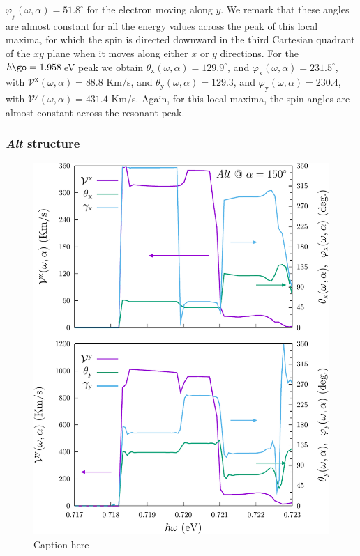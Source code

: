 \documentclass[prb,11pt,tightenlines,twocolumn,aps]{revtex4-1}
\begin{document}
$\varphi_{\mathrm{y}} (\omega,\alpha) = 51.8^{\circ}$
% 
for the electron moving along $y$. We remark that these angles are almost
constant for all the energy values across the peak of this local maxima, for
which the spin is directed downward in the third Cartesian quadrant of the $xy$
plane when it moves along either $x$ or $y$ directions. 
% 
For the $\hbar\go=1.958$\,eV peak we obtain 
$\theta_{\mathrm{x}} (\omega,\alpha) = 129.9^{\circ}$, and 
$\varphi_{\mathrm{x}} (\omega,\alpha) = 231.5^{\circ}$, with 
$\mathcal{V}^{\mathrm{x}} (\omega,\alpha) = 88.8$ Km/s, and
% 
$\theta_{\mathrm{y}}(\omega,\alpha) =129.3$, and
$\varphi_{\mathrm{y}}(\omega,\alpha) = 230.4$, with 
$\mathcal{V}^{\mathrm{y}} (\omega,\alpha) = 431.4$ Km/s. 
% 
Again, for this local maxima, the spin angles are almost constant across the
resonant peak.

\subsubsection{\emph{Alt} structure}

\begin{figure}[tb]
    \centering
    \includegraphics[width=\linewidth]{altplots/alt-vx-vy-w1}
    \caption{Caption here}
    \label{fig:alt-vx-vy-w1}
\end{figure}
\end{document}
